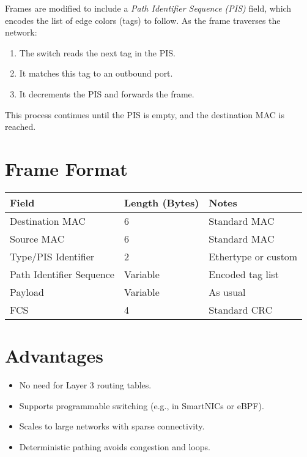 \documentclass[../OAE-SPEC-MAIN.tex]{subfiles}
\begin{document}
Frames are modified to include a \emph{Path Identifier Sequence (PIS)} field, which encodes the list of edge colors (tags) to follow. As the frame traverses the network:

\begin{enumerate}
    \item The switch reads the next tag in the PIS.
    \item It matches this tag to an outbound port.
    \item It decrements the PIS and forwards the frame.
\end{enumerate}

This process continues until the PIS is empty, and the destination MAC is reached.

\section{Frame Format}

\vspace{6pt}
\begin{tabular}{@{}lll@{}}
\toprule
\textbf{Field}             & \textbf{Length (Bytes)} & \textbf{Notes} \\
\midrule
Destination MAC           & 6                      & Standard MAC \\
Source MAC                & 6                      & Standard MAC \\
Type/PIS Identifier       & 2                      & Ethertype or custom \\
Path Identifier Sequence  & Variable               & Encoded tag list \\
Payload                   & Variable               & As usual \\
FCS                       & 4                      & Standard CRC \\
\bottomrule
\end{tabular}
\vspace{12pt}

\section{Advantages}

\begin{itemize}
    \item No need for Layer 3 routing tables.
    \item Supports programmable switching (e.g., in SmartNICs or eBPF).
    \item Scales to large networks with sparse connectivity.
    \item Deterministic pathing avoids congestion and loops.
\end{itemize}
\end{document}
